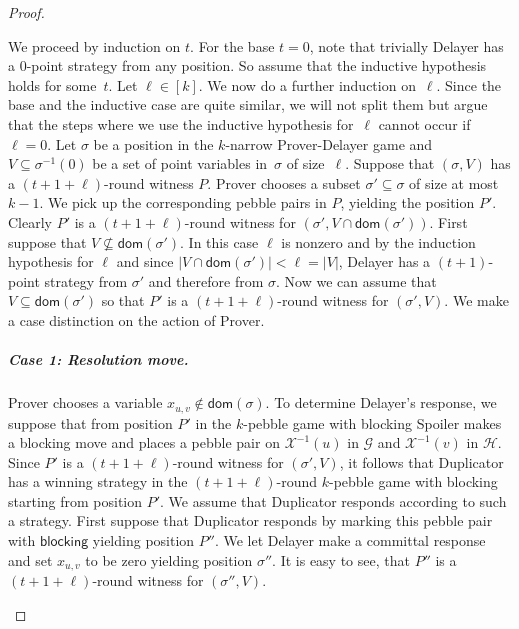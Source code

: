 \documentclass[a4paper,english, thm-restate]{lipics-v2021}
\newcommand{\blocking}{\mathsf{blocking}}
\newcommand{\inv}[1]{#1^{-1}}
\newcommand{\graphG}{\mathcal{G}}
\newcommand{\graphH}{\mathcal{H}}
\newcommand{\dom}{\mathsf{dom}}
\newcommand{\X}{\mathcal{X}}
\newcommand{\XI}{\X^{-1}}
\begin{document}
\begin{proof}
\begin{claimproof}
We proceed by induction on $t$.
For the base $t=0$, note that trivially Delayer has a 0-point strategy from any position. So assume that the inductive hypothesis holds for some~$t$. Let $\ell \in [k]$.
We now do a further induction on~$\ell$.
Since the base and the inductive case are quite similar,
we will not split them but argue that the steps where we use the inductive hypothesis for~$\ell$ cannot occur if $\ell = 0$.
Let $\sigma$ be a position in the $k$-narrow Prover-Delayer game and $V\subseteq \inv{\sigma}(0)$ be a set of point variables in~$\sigma$ of size~$\ell$. Suppose that
$(\sigma,V)$ has a $(t+1+\ell)$-round witness $P$.
Prover chooses a subset $\sigma' \subseteq \sigma$ of size at most $k-1$. We pick up the corresponding pebble pairs in $P$, yielding the position $P'$. Clearly $P'$ is a $(t+1+\ell)$-round witness for $(\sigma',V \cap \dom(\sigma'))$.
%
%
%
%
%
First suppose that $V \not \subseteq \dom(\sigma')$. In this case
$\ell$ is nonzero and 
by the induction hypothesis for $\ell$ and since $|V \cap \dom(\sigma')|<\ell = |V|$, Delayer has a $(t+1)$-point strategy from $\sigma'$ and therefore from $\sigma$.
Now we can assume that $V \subseteq \dom(\sigma')$ so that $P'$ is a $(t+1+\ell)$-round witness for $(\sigma', V)$. We make a case distinction on the action of Prover.

\subparagraph{Case 1: Resolution move.} Prover chooses a variable $x_{u,v} \not \in \dom(\sigma)$. To determine Delayer's response, we suppose that from position $P'$ in the $k$-pebble game with blocking Spoiler makes a blocking move and
places a pebble pair on $\XI(u)$ in $\graphG$ and $\XI(v)$ in $\graphH$. Since $P'$ is a $(t+1+\ell)$-round witness for $(\sigma', V)$, it follows that Duplicator has a winning strategy in the $(t+1+\ell)$-round $k$-pebble game with blocking starting from position $P'$. We assume that Duplicator responds according to such a strategy. First suppose that Duplicator responds by marking this pebble pair with $\blocking$ yielding position $P''$. We let Delayer make a committal response and set $x_{u,v}$ to be zero yielding position $\sigma''$. It is easy to see, that $P''$ is a $(t+1+\ell)$-round witness for $(\sigma'', V)$.


\end{claimproof}
\end{proof}
\end{document}
